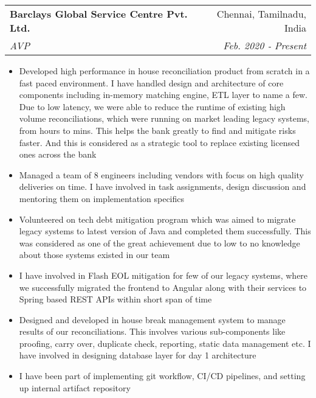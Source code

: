 \documentclass[letterpaper,11pt]{article}
\makeatletter
\newcommand{\resumeItem}[1]{
  \item\small{
    #1
  }
}
\newcommand{\resumeSubheading}[4]{
  \vspace{-1pt}\item
    \begin{tabular*}{0.97\textwidth}[t]{l@{\extracolsep{\fill}}r}
      \textbf{#1} & #2 \\
      \textit{\small#3} & \textit{\small #4} \\
    \end{tabular*}\vspace{-5pt}
}
\newcommand{\resumeSubSubheading}[2]{
    \begin{tabular*}{0.97\textwidth}{l@{\extracolsep{\fill}}r}
      \textit{\small#1} & \textit{\small #2} \\
    \end{tabular*}\vspace{-5pt}
}
\newcommand{\resumeSubHeadingListEnd}{\end{itemize}}
\newcommand{\resumeItemListStart}{\begin{itemize}}
\newcommand{\resumeItemListEnd}{\end{itemize}\vspace{-5pt}}
\makeatother
\begin{document}
    \resumeSubheading
      {Barclays Global Service Centre Pvt. Ltd.}{Chennai, Tamilnadu, India}
      {AVP}{Feb. 2020 ‑ Present}
      \resumeItemListStart
        \resumeItem
          {Developed high performance in house reconciliation product from scratch in a fast paced environment. I have handled design and architecture of core components including in-memory matching engine, ETL layer to name a few. Due to low latency, we were able to reduce the runtime of existing high volume reconciliations, which were running on market leading legacy systems, from hours to mins. This helps the bank greatly to find and mitigate risks faster. And this is considered as a strategic tool to replace existing licensed ones across the bank}
        \resumeItem
          {Managed a team of 8 engineers including vendors with focus on high quality deliveries on time. I have involved in task assignments, design discussion and mentoring them on implementation specifics}
        \resumeItem
          {Volunteered on tech debt mitigation program which was aimed to migrate legacy systems to latest version of Java and completed them successfully. This was considered as one of the great achievement due to low to no knowledge about those systems existed in our team}
        \resumeItem
          {I have involved in Flash EOL mitigation for few of our legacy systems, where we successfully migrated the frontend to Angular along with their services to Spring based REST APIs within short span of time}
        \resumeItem
          {Designed and developed in house break management system to manage results of our reconciliations. This involves various sub-components like proofing, carry over, duplicate check, reporting, static data management etc. I have involved in designing database layer for day 1 architecture}
        \resumeItem
          {I have been part of implementing git workflow, CI/CD pipelines, and setting up internal artifact repository}
        
      \resumeItemListEnd
      
\end{document}
